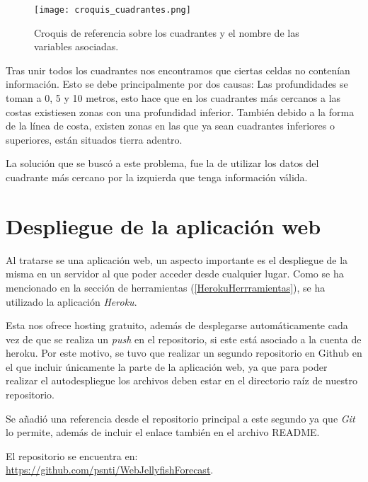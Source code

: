 \begin{figure}%
	\centering
	\texttt{[image: croquis\_cuadrantes.png]}
	\caption[Croquis de referencia sobre los cuadrantes y el nombre de las variables asociadas.]{Croquis de referencia sobre los cuadrantes y el nombre de las variables asociadas.}\label{croquis_cuadrantes}
\end{figure}

Tras unir todos los cuadrantes nos encontramos que ciertas celdas no contenían información. Esto se debe principalmente por dos causas: Las profundidades se toman a 0, 5 y 10 metros, esto hace que en los cuadrantes más cercanos a las costas existiesen zonas con una profundidad inferior. También debido a la forma de la línea de costa, existen zonas en las que ya sean cuadrantes inferiores o superiores, están situados tierra adentro.

La solución que se buscó a este problema, fue la de utilizar los datos del cuadrante más cercano por la izquierda que tenga información válida.

\section{Despliegue de la aplicación web}
Al tratarse se una aplicación web, un aspecto importante es el despliegue de la misma en un servidor al que poder acceder desde cualquier lugar. Como se ha mencionado en la sección de herramientas (\ref{HerokuHerrramientas}), se ha utilizado la aplicación \emph{Heroku}.

Esta nos ofrece hosting gratuito, además de desplegarse automáticamente cada vez de que se realiza un \emph{push} en el repositorio, si este está asociado a la cuenta de heroku. Por este motivo, se tuvo que realizar un segundo repositorio en Github en el que incluir únicamente la parte de la aplicación web, ya que para poder realizar el autodespliegue los archivos deben estar en el directorio raíz de nuestro repositorio.

Se añadió una referencia desde el repositorio principal a este segundo ya que \emph{Git} lo permite, además de incluir el enlace también en el archivo README. 

El repositorio se encuentra en:\\ \url{https://github.com/psnti/WebJellyfishForecast}.


